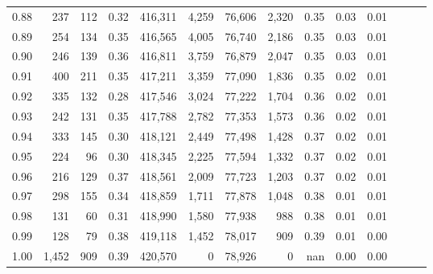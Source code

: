\begin{tabular}{rrrrrrrrrrrrrr}
0.88 &     237 &    112 &  0.32 &  416,311 &    4,259 &  76,606 &   2,320 &  0.35 &  0.03 &      0.01 \\
0.89 &     254 &    134 &  0.35 &  416,565 &    4,005 &  76,740 &   2,186 &  0.35 &  0.03 &      0.01 \\
0.90 &     246 &    139 &  0.36 &  416,811 &    3,759 &  76,879 &   2,047 &  0.35 &  0.03 &      0.01 \\
0.91 &     400 &    211 &  0.35 &  417,211 &    3,359 &  77,090 &   1,836 &  0.35 &  0.02 &      0.01 \\
0.92 &     335 &    132 &  0.28 &  417,546 &    3,024 &  77,222 &   1,704 &  0.36 &  0.02 &      0.01 \\
0.93 &     242 &    131 &  0.35 &  417,788 &    2,782 &  77,353 &   1,573 &  0.36 &  0.02 &      0.01 \\
0.94 &     333 &    145 &  0.30 &  418,121 &    2,449 &  77,498 &   1,428 &  0.37 &  0.02 &      0.01 \\
0.95 &     224 &     96 &  0.30 &  418,345 &    2,225 &  77,594 &   1,332 &  0.37 &  0.02 &      0.01 \\
0.96 &     216 &    129 &  0.37 &  418,561 &    2,009 &  77,723 &   1,203 &  0.37 &  0.02 &      0.01 \\
0.97 &     298 &    155 &  0.34 &  418,859 &    1,711 &  77,878 &   1,048 &  0.38 &  0.01 &      0.01 \\
0.98 &     131 &     60 &  0.31 &  418,990 &    1,580 &  77,938 &     988 &  0.38 &  0.01 &      0.01 \\
0.99 &     128 &     79 &  0.38 &  419,118 &    1,452 &  78,017 &     909 &  0.39 &  0.01 &      0.00 \\
1.00 &   1,452 &    909 &  0.39 &  420,570 &        0 &  78,926 &       0 &   nan &  0.00 &      0.00 \\
\bottomrule
\end{tabular}
